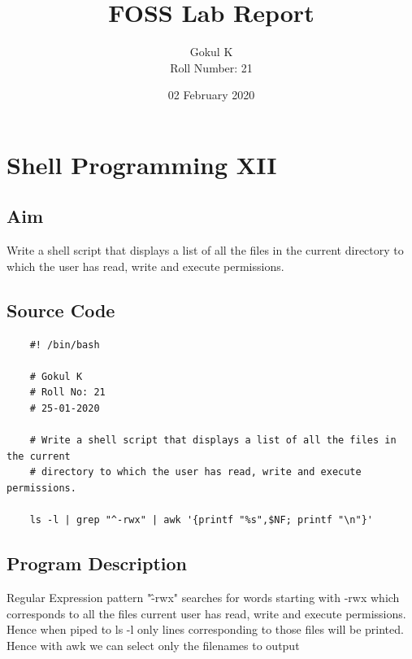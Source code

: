 \documentclass{article}
\begin{document}
\title{FOSS Lab Report}
\author{Gokul K\\[2\baselineskip]
Roll Number: 21\\[2\baselineskip]}
\date{02 February 2020}

\maketitle

\setcounter{section}{15}
\section{Shell Programming XII}
\subsection{Aim}
Write a shell script that displays a list of all the files in the current
directory to which the user has read, write and execute permissions.


\subsection{Source Code}
\begin{verbatim}
    #! /bin/bash

    # Gokul K
    # Roll No: 21
    # 25-01-2020

    # Write a shell script that displays a list of all the files in the current
    # directory to which the user has read, write and execute permissions.

    ls -l | grep "^-rwx" | awk '{printf "%s",$NF; printf "\n"}'

\end{verbatim}

\subsection{Program Description}
Regular Expression pattern "\^-rwx" searches for words starting with -rwx which\newline
corresponds to all the files current user has read, write and execute permissions.\newline
Hence when piped to ls -l only lines corresponding to those files will be printed. Hence\newline
with awk we can select only the filenames to output
\end{document}
